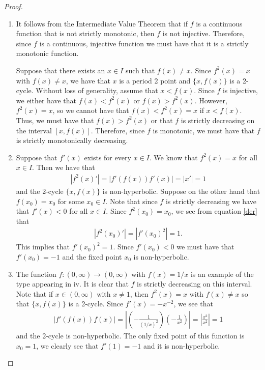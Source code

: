 \begin{proof}
\begin{enumerate}
    \item It follows from the Intermediate Value Theorem that if
      $f$ is a continuous function that is not strictly monotonic, then $f$ is not
      injective. Therefore, since $f$ is a continuous, injective function we must have
      that it is a strictly monotonic function.

      Suppose that there exists an $x\in I$ such that $f(x) \neq x$. Since $f^2(x) = x$ with
      $f(x) \neq x$, we have that $x$ is a period 2 point and $\{x, f(x)\}$ is a 2-cycle.
      Without loss of generality, assume that $x < f(x)$. Since $f$ is injective,
      we either have that $f(x) < f^2(x)$ or $f(x) > f^2(x)$. However, $f^2(x) = x$,
      so we cannot have that $f(x) < f^2(x) = x$ if $x < f(x)$. Thus, we must have
      that $f(x) > f^2(x)$ or that $f$ is strictly decreasing on the interval $[x, f(x)]$.
      Therefore, since $f$ is monotonic, we must have that $f$ is strictly monotonically
      decreasing.

    \item Suppose that $f'(x)$ exists for every $x \in I$. We know that $f^2(x) = x$
      for all $x\in I$. Then we have that
      \begin{align}\label{der}
        |f^2(x)'| = |f'(f(x))f'(x)| = |x'| = 1
      \end{align}
      and the 2-cycle $\{x, f(x)\}$ is non-hyperbolic. Suppose on the other hand that
      $f(x_0) = x_0$ for some $x_0\in I$. Note that since $f$ is strictly decreasing we have that $f'(x) < 0$
      for all $x\in I$. Since $f^2(x_0) = x_0$, we see from equation \eqref{der} that
      \begin{align*}
        |f^2(x_0)'| = |f'(x_0)^2| = 1.
      \end{align*}
      This implies that $f'(x_0)^2 = 1$. Since $f'(x_0) < 0$ we must have that $f'(x_0) = -1$
      and the fixed point $x_0$ is non-hyperbolic.

    \item The function $f: (0, \infty) \to (0, \infty)$
      with $f(x) = 1/x$ is an example of the type appearing in iv. It is clear that $f$ is strictly decreasing
      on this interval. Note that if
      $x\in (0, \infty)$ with $x\neq 1$, then $f^2(x) = x$ with $f(x) \neq x$ so that $\{x, f(x)\}$ is a 2-cycle.
      Since $f'(x) = -x^{-2}$, we see that
      \begin{align*}
        |f'(f(x))f(x)| = \left| \left(- \frac{1}{(1/x)^2}\right) \left(- \frac{1}{x^2}\right)\right| = \left|\frac{x^2}{x^2}\right| = 1
      \end{align*}
      and the 2-cycle is non-hyperbolic. The only fixed point of this function is $x_0 = 1$, we clearly see
      that $f'(1) = -1$ and it is non-hyperbolic.
  \end{enumerate}
\end{proof}
\newpage
